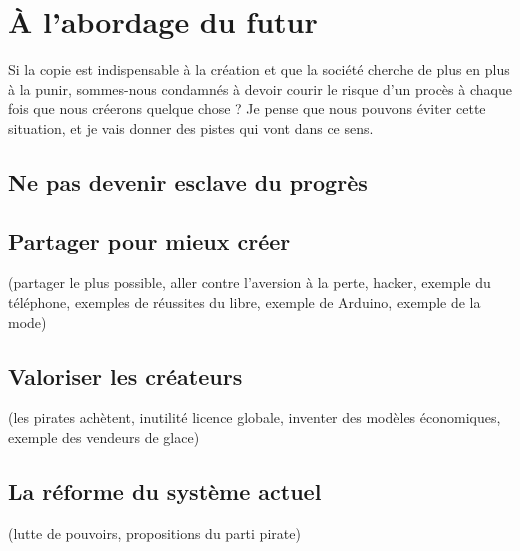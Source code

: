 \chapter{À l'abordage du futur}

Si la copie est indispensable à la création et que la société cherche de plus en plus à la punir, sommes-nous condamnés à devoir courir le risque d'un procès à chaque fois que nous créerons quelque chose ?
Je pense que nous pouvons éviter cette situation, et je vais donner des pistes qui vont dans ce sens.

\section{Ne pas devenir esclave du progrès}



\section{Partager pour mieux créer}
(partager le plus possible, aller contre l'aversion à la perte, hacker, exemple du téléphone, exemples de réussites du libre, exemple de Arduino, exemple de la mode)
\section{Valoriser les créateurs}
(les pirates achètent, inutilité licence globale, inventer des modèles économiques, exemple des vendeurs de glace)
\section{La réforme du système actuel}
(lutte de pouvoirs, propositions du parti pirate)
